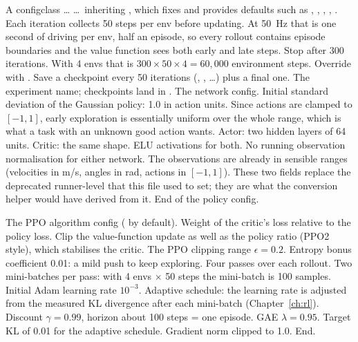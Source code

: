 \begin{explain}
 A configclass \ldots
{} \ldots\ inheriting , which fixes
   and provides defaults such as
  , , ,
  , .
 Each iteration collects 50 steps per env before updating. At 50~Hz
  that is one second of driving per env, half an episode, so every rollout
  contains episode boundaries and the value function sees both early and
  late steps.
 Stop after 300 iterations. With 4 envs that is $300\times50\times4 =
  60{,}000$ environment steps. Override with .
 Save a checkpoint every 50 iterations
  (, , \ldots) plus a final one.
 The experiment name; checkpoints land in
  .
 The network config.
 Initial standard deviation of the Gaussian policy: 1.0 in action
  units. Since actions are clamped to $[-1,1]$, early exploration is
  essentially uniform over the whole range, which is what a task with an
  unknown good action wants.
 Actor: two hidden layers of 64 units.
 Critic: the same shape.
 ELU activations for both.
 No running observation normalisation for either network. The
  observations are already in sensible ranges (velocities in m/s, angles in
  rad, actions in $[-1,1]$). These two fields replace the deprecated
  runner-level  that this file used to
  set; they are what the conversion helper would have derived from it.
 End of the policy config.
\end{explain}


\begin{explain}
 The PPO algorithm config ( by default).
 Weight of the critic's loss relative to the policy loss.
 Clip the value-function update as well as the policy ratio
  (PPO2 style), which stabilises the critic.
 The PPO clipping range $\epsilon = 0.2$.
 Entropy bonus coefficient 0.01: a mild push to keep exploring.
 Four passes over each rollout.
 Two mini-batches per pass: with 4 envs $\times$ 50 steps the
  mini-batch is 100 samples.
 Initial Adam learning rate $10^{-3}$.
 Adaptive schedule: the learning rate is adjusted from the measured
  KL divergence after each mini-batch (Chapter~\ref{ch:rl}).
 Discount $\gamma = 0.99$, horizon about 100 steps = one episode.
 GAE $\lambda = 0.95$.
 Target KL of 0.01 for the adaptive schedule.
 Gradient norm clipped to 1.0.
 End.
\end{explain}

